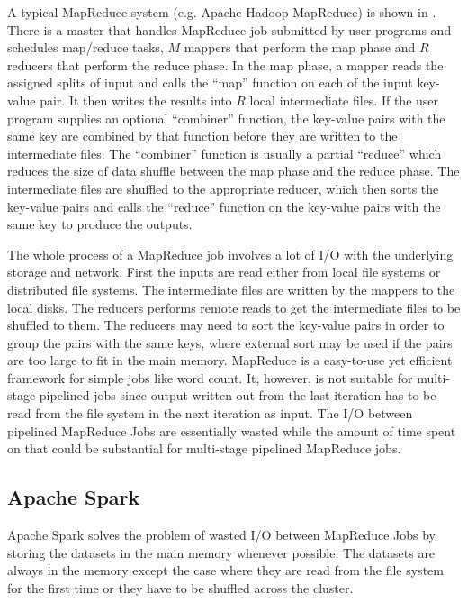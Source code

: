 A typical MapReduce system (e.g. Apache Hadoop MapReduce) is shown in
. There is a master that handles MapReduce job submitted
by user programs and schedules map/reduce tasks, $M$ mappers that perform the
map phase and $R$ reducers that perform the reduce phase. In the map phase, a
mapper reads the assigned splits of input and calls the ``map'' function on
each of the input key-value pair. It then writes the results into $R$ local
intermediate files. If the user program supplies an optional ``combiner''
function, the key-value pairs with the same key are combined by that function
before they are written to the intermediate files. The ``combiner'' function is
usually a partial ``reduce'' which reduces the size of data shuffle between the
map phase and the reduce phase. The intermediate files are shuffled to the
appropriate reducer, which then sorts the key-value pairs and calls the
``reduce'' function on the key-value pairs with the same key to produce the
outputs.

The whole process of a MapReduce job involves a lot of I/O with the underlying
storage and network. First the inputs are read either from local file systems
or distributed file systems. The intermediate files are written by the mappers
to the local disks. The reducers performs remote reads to get the intermediate
files to be shuffled to them. The reducers may need to sort the key-value
pairs in order to group the pairs with the same keys, where external sort may
be used if the pairs are too large to fit in the main memory. MapReduce is a
easy-to-use yet efficient framework for simple jobs like word count. It,
however, is not suitable for multi-stage pipelined jobs since output written out
from the last iteration has to be read from the file system in the next iteration 
as input. The I/O between pipelined MapReduce Jobs are essentially wasted
while the amount of time spent on that could be substantial for multi-stage
pipelined MapReduce jobs.


\subsection{Apache Spark}

Apache Spark  solves the problem of
wasted I/O between MapReduce Jobs by storing the datasets in the main memory
whenever possible. The datasets are always in the memory except the case where
they are read from the file system for the first time or they have to be
shuffled across the cluster.

